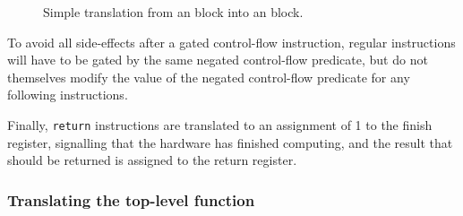\begin{figure}
  \centering
  \caption{Simple translation from an \rtlsubpar{} block into an \htl{} block.}%
  \label{fig:hg:htl-generation}
\end{figure}

To avoid all side-effects after a gated control-flow instruction, regular
instructions will have to be gated by the same negated control-flow predicate,
but do not themselves modify the value of the negated control-flow predicate for
any following instructions.

Finally, \texttt{return} instructions are translated to an assignment of 1 to
the \htl{} finish register, signalling that the hardware has finished computing,
and the result that should be returned is assigned to the return register.

\subsubsection{Translating the top-level function}

